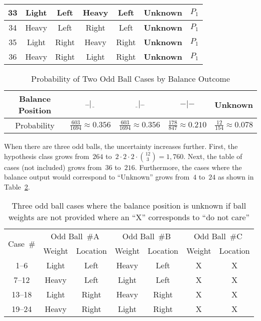 \begin{table}[H]
\begin{tabular}{|c||c|c||c|c||c||c|}
      33  &  Light   &  Left     &  Heavy   &  Left    &  \textbf{Unknown} & $P_{1}$ \\ \hline
      34  &  Heavy   &  Left     &  Right   &  Left    &  \textbf{Unknown} & $P_{1}$ \\ \hline
      35  &  Light   &  Right    &  Heavy   &  Right   &  \textbf{Unknown} & $P_{1}$ \\ \hline
      36  &  Heavy   &  Right    &  Light   &  Right   &  \textbf{Unknown} & $P_{1}$ \\ \hline
    \end{tabular}
  \end{table}

  \begin{table}
    \centering
    \caption{Probability of Two Odd Ball Cases by Balance Outcome}\label{tab:twoBallProbabilityBreakdown}
    \begin{tabular}{|c||c|c|c|c|}
      \hline
      Balance Position & $\bar{~}\bar{~}|\underline{~~}$  & $\underline{~~}|\bar{~}\bar{~}$  & $-|-$ & Unknown \\\hline
      Probability      & $\frac{603}{1694} \approx 0.356$ & $\frac{603}{1694} \approx 0.356$ & $\frac{178}{847} \approx 0.210$ & $\frac{12}{154} \approx 0.078$    \\\hline
    \end{tabular}
  \end{table}
  
  When there are three odd balls, the uncertainty increases further.  First, the hypothesis class grows from~$264$ to~${2\cdot2\cdot2\cdot\binom{12}{3} = 1,760}$.  Next, the table of cases (not included) grows from~$36$ to~$216$.  Furthermore, the cases where the balance output would correspond to ``Unknown'' grows from~$4$ to~$24$ as shown in Table~\ref{tab:p1ThreeBallsUnknownWeights}.
  
  \begin{table}[H]
    \centering
    \caption{Three odd ball cases where the balance position is unknown if ball weights are not provided where an ``X'' corresponds to ``do not care''}\label{tab:p1ThreeBallsUnknownWeights}
    \begin{tabular}{|c||c|c||c|c||c|c|}
      \hline
      \multirow{2}{*}{Case~\#} & \multicolumn{2}{c||}{Odd Ball~\#A} & \multicolumn{2}{c||}{Odd Ball~\#B} & \multicolumn{2}{c|}{Odd Ball~\#C}\\\cline{2-7}
          &  Weight  &  Location &  Weight  &  Location &  Weight  &  Location  \\ \hline\hline
      
      1--6   &  Light &  Left  &  Heavy &  Left  &  X &  X   \\ \hline
      7--12  &  Heavy &  Left  &  Light &  Left  &  X &  X   \\ \hline
      13--18 &  Light &  Right &  Heavy &  Right &  X &  X   \\ \hline
      19--24 &  Heavy &  Right &  Light &  Right &  X &  X   \\ \hline
    \end{tabular}
  \end{table}
  
